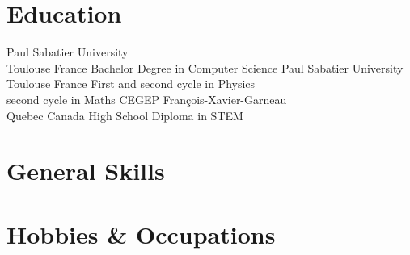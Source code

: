 \documentclass[%
               doublesided,
               paper=a4,
               fontsize=10pt
              ]{my-resume}
\begin{document}
{    \section[\faMortarBoard]{Education}
        {Paul Sabatier University \\ Toulouse France}
        {Bachelor Degree in Computer Science}
        {}
        {Paul Sabatier University \\ Toulouse France}
        {First and second cycle in Physics \\ second cycle in Maths}
        {}
        {CEGEP François-Xavier-Garneau \\ Quebec Canada}
        {High School Diploma in STEM}
        {}

    \section{General Skills}
    \smallskip %
    
    
    \section{Hobbies \& Occupations}
    
    
}
\makebody
\end{document}
